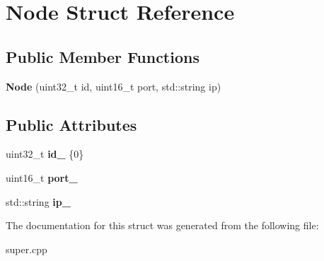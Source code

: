 \hypertarget{structNode}{}\section{Node Struct Reference}
\label{structNode}
\subsection*{Public Member Functions}
\begin{DoxyCompactItemize}
\item 
{\bfseries Node} (uint32\+\_\+t id, uint16\+\_\+t port, std\+::string ip)\hypertarget{structNode_a882fe2bb4ab939fc4ba38d24d9ab38c4}{}\label{structNode_a882fe2bb4ab939fc4ba38d24d9ab38c4}

\end{DoxyCompactItemize}
\subsection*{Public Attributes}
\begin{DoxyCompactItemize}
\item 
uint32\+\_\+t {\bfseries id\+\_\+} \{0\}\hypertarget{structNode_a559a1e4ccf7c3a7891b23c46b8f3ced6}{}\label{structNode_a559a1e4ccf7c3a7891b23c46b8f3ced6}

\item 
uint16\+\_\+t {\bfseries port\+\_\+}\hypertarget{structNode_ab7bc6b40aa43d0876be3990e06a7a1c2}{}\label{structNode_ab7bc6b40aa43d0876be3990e06a7a1c2}

\item 
std\+::string {\bfseries ip\+\_\+}\hypertarget{structNode_a3264120631e4c6d244a3b210030e2b08}{}\label{structNode_a3264120631e4c6d244a3b210030e2b08}

\end{DoxyCompactItemize}


The documentation for this struct was generated from the following file\+:\begin{DoxyCompactItemize}
\item 
super.\+cpp\end{DoxyCompactItemize}

